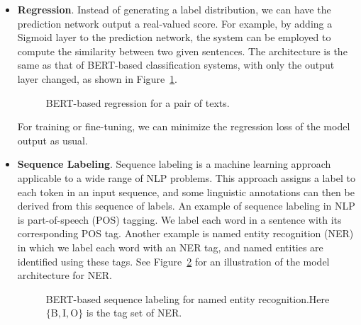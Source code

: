 \begin{itemize}
    \noindent Text pair classification covers several problems, including semantic equivalence judgement (determine whether two texts are semantically equivalent)~\cite{dolan-brockett:2005automatically}, text entailment judgement (determine whether a hypothesis can be logically inferred or entailed from a premise)~\cite{bentivogli-giampiccolo:2011rte,williams-etal:2018broad}, grounded commonsense inference (determine whether an event is likely to happen given its context)~\cite{zellers-etal:2018swag}, and question-answering inference (determine whether an answer corresponds to a given question).

\item \vspace{0.3em} \textbf{Regression}. Instead of generating a label distribution, we can have the prediction network output a real-valued score. For example, by adding a Sigmoid layer to the prediction network, the system can be employed to compute the similarity between two given sentences. The architecture is the same as that of BERT-based classification systems, with only the output layer changed, as shown in Figure~\ref{fig:bert-app-regression-two-texts}.

\begin{figure}[!ht]
\centering

\caption{BERT-based regression for a pair of texts.}
\label{fig:bert-app-regression-two-texts}
\end{figure}

    For training or fine-tuning, we can minimize the regression loss of the model output as usual.

\item \vspace{0.3em} \textbf{Sequence Labeling}. Sequence labeling is a machine learning approach applicable to a wide range of NLP problems. This approach assigns a label to each token in an input sequence, and some linguistic annotations can then be derived from this sequence of labels. An example of sequence labeling in NLP is part-of-speech (POS) tagging. We label each word in a sentence with its corresponding POS tag. Another example is named entity recognition (NER) in which we label each word with an NER tag, and named entities are identified using these tags. See Figure~\ref{fig:bert-app-sequence-labeling} for an illustration of the model architecture for NER.

\begin{figure}[!ht]
\centering

\caption{BERT-based sequence labeling for named entity recognition.Here $\{\mathrm{B}, \mathrm{I}, \mathrm{O}\}$ is the tag set of NER.}
\label{fig:bert-app-sequence-labeling}
\end{figure}


\end{itemize}
